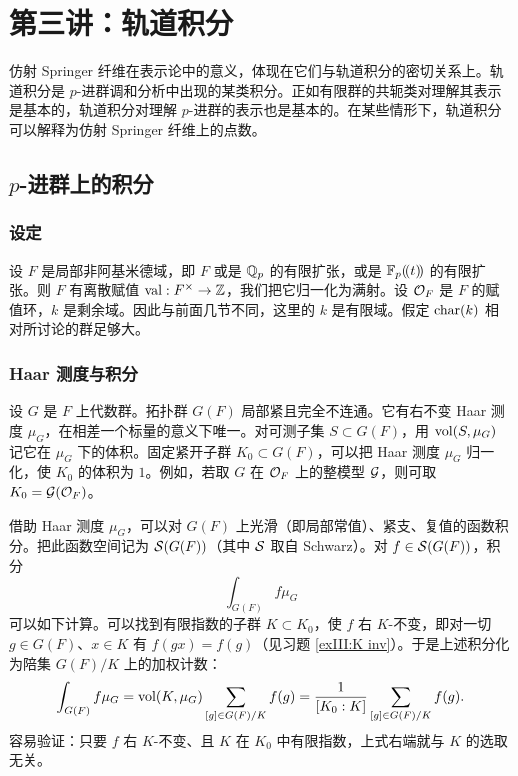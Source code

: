 \section{第三讲：轨道积分}\label{s:orb}
仿射 Springer 纤维在表示论中的意义，体现在它们与轨道积分的密切关系上。轨道积分是 $p$-进群调和分析中出现的某类积分。正如有限群的共轭类对理解其表示是基本的，轨道积分对理解 $p$-进群的表示也是基本的。在某些情形下，轨道积分可以解释为仿射 Springer 纤维上的点数。

\subsection{$p$-进群上的积分}\label{ss:int}

\subsubsection{设定} 设 $F$ 是局部非阿基米德域，即 $F$ 或是 $\mathbb{Q}_{p}$ 的有限扩张，或是 $\mathbb{F}_{p}(\!(t)\!)$ 的有限扩张。则 $F$ 有离散赋值 $\textup{val}: F^{\times}\to \mathbb{Z}$，我们把它归一化为满射。设 $\mathcal{O}_{F}$ 是 $F$ 的赋值环，$k$ 是剩余域。因此与前面几节不同，这里的 $k$ 是有限域。假定 $\textup{char}(k)$ 相对所讨论的群足够大。

\subsubsection{Haar 测度与积分} 设 $G$ 是 $F$ 上代数群。拓扑群 $G(F)$ 局部紧且完全不连通。它有右不变 Haar 测度 $\mu_{G}$，在相差一个标量的意义下唯一。对可测子集 $S\subset G(F)$，用 $\textup{vol}(S,\mu_{G})$ 记它在 $\mu_{G}$ 下的体积。固定紧开子群 $K_{0}\subset G(F)$，可以把 Haar 测度 $\mu_{G}$ 归一化，使 $K_{0}$ 的体积为 $1$。例如，若取 $G$ 在 $\mathcal{O}_{F}$ 上的整模型 $\mathcal{G}$，则可取 $K_{0}=\mathcal{G}(\mathcal{O}_{F})$。

借助 Haar 测度 $\mu_{G}$，可以对 $G(F)$ 上光滑（即局部常值）、紧支、复值的函数积分。把此函数空间记为 $\mathcal{S}(G(F))$（其中 $\mathcal{S}$ 取自 Schwarz）。对 $f\in\mathcal{S}(G(F))$，积分
\begin{equation*}
\int_{G(F)}f\mu_{G}
\end{equation*}
可以如下计算。可以找到有限指数的子群 $K\subset K_{0}$，使 $f$ 右 $K$-不变，即对一切 $g\in G(F)$、$x\in K$ 有 $f(gx)=f(g)$（见习题 \ref{exIII:K inv}）。于是上述积分化为陪集 $G(F)/K$ 上的加权计数：
\begin{equation*}
\int_{G(F)}f\mu_{G}=\textup{vol}(K,\mu_{G})\sum_{[g]\in G(F)/K}f(g)=\frac{1}{[K_{0}:K]}\sum_{[g]\in G(F)/K}f(g).
\end{equation*}
容易验证：只要 $f$ 右 $K$-不变、且 $K$ 在 $K_{0}$ 中有限指数，上式右端就与 $K$ 的选取无关。

